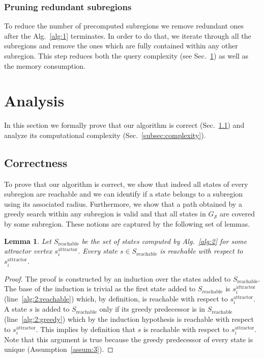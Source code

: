 \documentclass[letterpaper]{article} %
\newcommand{\calS}{\ensuremath{\mathcal{S}}\xspace}
\newcommand{\sAttract}{\ensuremath{s^{\text{attractor}}_i}\xspace}
\newtheorem{lemma}{Lemma}
\begin{document}
\subsubsection{Pruning redundant subregions}
To reduce the number of precomputed subregions we remove redundant ones after the Alg.~\ref{alg:1} terminates. 
In order to do that, we iterate through all the subregions and remove the ones which are fully contained within any other subregion. 
This step reduces both the query complexity (see Sec.~\ref{sec:analysis}) as well as the memory consumption.

\section {Analysis}
\label{sec:analysis}
In this section we formally prove that 
our algorithm is correct (Sec.~\ref{subsec:correct}) and 
analyze its computational complexity (Sec.~\ref{subsec:complexity}).

\subsection{Correctness}
\label{subsec:correct}
To prove that our algorithm is correct, we show that indeed all states of every subregion are reachable and we can identify if a state belongs to a subregion using its associated radius.
Furthermore, we show that a path obtained by a greedy search within any subregion is valid and that all states in $G_\calS$ are covered by some subregion.
These notions are captured by the following set of lemmas.

\vspace{2mm}
\begin{lemma}
\label{lemma:reachable-1}
Let $S_{\text{reachable}}$ be the set of states computed by Alg.~\ref{alg:2} for some attractor vertex \sAttract.
%
Every state $s \in S_{\text{reachable}}$ is reachable with respect to \sAttract.
\end{lemma}
%
\begin{proof}
The proof is constructed by an induction over the states added to $S_{\text{reachable}}$.
The base of the induction is trivial as the first state added to $S_{\text{reachable}}$  is \sAttract (line~\ref{alg:2:reachable}) which, by definition, is reachable with respect to \sAttract.
%
A state $s$ is added to $S_{\text{reachable}}$ only if its greedy predecessor is in $S_{\text{reachable}}$ (line~\ref{alg:2:greedy}) which by the induction hypothesis is reachable with respect to \sAttract.
This implies by definition that $s$ is reachable with respect to \sAttract.
%
Note that this argument is true because the greedy predecessor of every state is unique (Assumption~\ref{assum:3}).
\end{proof}
\end{document}
